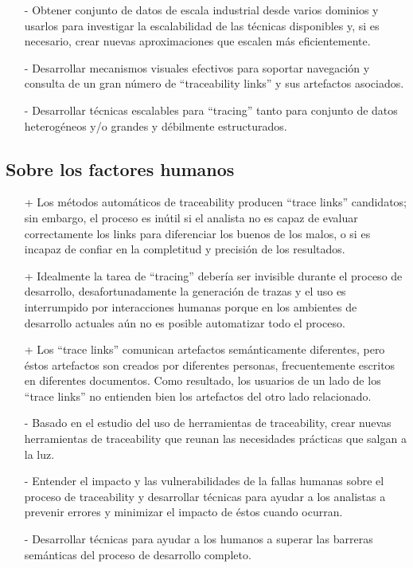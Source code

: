 \documentclass[a4paper,12pt,oneside]{book}
\begin{document}
\begin{itemize}
\item[-]    Obtener conjunto de datos de escala industrial desde varios dominios y usarlos para investigar la escalabilidad de las técnicas disponibles y, si es necesario, crear nuevas aproximaciones que escalen más eficientemente.
\item[-]    Desarrollar mecanismos visuales efectivos para soportar navegación y consulta de un gran número de “traceability links” y sus artefactos asociados.
\item[-]    Desarrollar técnicas escalables para “tracing” tanto para conjunto de datos heterogéneos y/o grandes y débilmente estructurados.
\end{itemize}


\subsection{Sobre los factores humanos}

\begin{itemize}
\item[+]     Los métodos automáticos de traceability producen “trace links” candidatos; sin embargo, el proceso es inútil si el analista no es capaz de evaluar correctamente los links  para diferenciar los buenos de los malos, o si es incapaz de confiar en la completitud y precisión de los resultados.
\item[+]     Idealmente la tarea de ``tracing'' debería ser invisible durante el proceso de desarrollo, desafortunadamente la generación de trazas y el uso es interrumpido por interacciones humanas porque en los ambientes de desarrollo actuales aún no es posible automatizar todo el proceso.
\item[+]     Los ``trace links'' comunican artefactos semánticamente diferentes, pero éstos artefactos son creados por diferentes personas, frecuentemente escritos en diferentes documentos. Como resultado, los usuarios de un lado de los ``trace links'' no entienden bien los artefactos del otro lado relacionado.
\end{itemize}

\begin{itemize}
\item[-]     Basado en el estudio del uso de herramientas de traceability, crear nuevas herramientas de traceability que reunan las necesidades prácticas que salgan a la luz.
\item[-]    Entender el impacto y las vulnerabilidades de la fallas humanas sobre el proceso de traceability y desarrollar técnicas para ayudar a los analistas a prevenir errores y minimizar el impacto de éstos cuando ocurran.
\item[-]    Desarrollar técnicas para ayudar a los humanos a superar las barreras semánticas del proceso de desarrollo completo.
\end{itemize}
\end{document}
